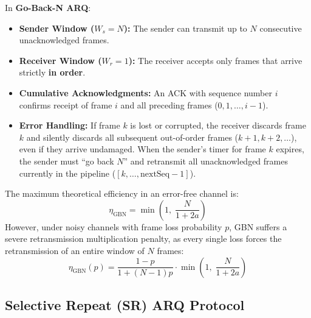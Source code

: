 \documentclass[11pt,a4paper]{article}
\begin{document}
In \textbf{Go-Back-N ARQ}:
\begin{itemize}
    \item \textbf{Sender Window (\(W_s = N\)):} The sender can transmit up to \(N\) consecutive unacknowledged frames.
    \item \textbf{Receiver Window (\(W_r = 1\)):} The receiver accepts only frames that arrive strictly \textbf{in order}.
    \item \textbf{Cumulative Acknowledgments:} An ACK with sequence number \(i\) confirms receipt of frame \(i\) and all preceding frames (\(0, 1, \dots, i-1\)).
    \item \textbf{Error Handling:} If frame \(k\) is lost or corrupted, the receiver discards frame \(k\) and silently discards all subsequent out-of-order frames (\(k+1, k+2, \dots\)), even if they arrive undamaged. When the sender's timer for frame \(k\) expires, the sender must ``go back \(N\)'' and retransmit all unacknowledged frames currently in the pipeline (\([k, \dots, \text{nextSeq}-1]\)).
\end{itemize}
The maximum theoretical efficiency in an error-free channel is:
\begin{equation}
    \eta_{\text{GBN}} = \min\left(1, \; \frac{N}{1 + 2a}\right)
\end{equation}
However, under noisy channels with frame loss probability \(p\), GBN suffers a severe retransmission multiplication penalty, as every single loss forces the retransmission of an entire window of \(N\) frames:
\begin{equation}
    \eta_{\text{GBN}}(p) = \frac{1 - p}{1 + (N - 1)p} \cdot \min\left(1, \; \frac{N}{1 + 2a}\right)
\end{equation}

\subsection{Selective Repeat (SR) ARQ Protocol}
\end{document}
